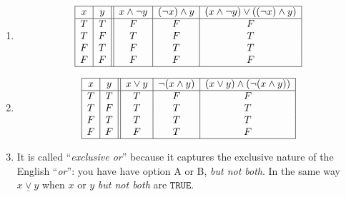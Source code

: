 \documentclass{article}
\theoremstyle{definition}
\newcommand{\xor}{\underline{\lor}}
\begin{document}
\begin{solution}
	\begin{enumerate}
	\item 
	\[\begin{array}{| c | c || c | c | c |}
	\hline
	x & y & x\wedge \neg y & (\neg x)\wedge y & (x \wedge \neg y) \vee ((\neg x) \wedge y)\\
	\hline
		T & T & F & F & F\\
		T & F & T & F & T\\
		F & T & F & T & T\\
		F & F & F & F & F\\
	\hline
	\end{array}\]
	\item 
	\[\begin{array}{| c | c || c | c | c |}
	\hline
	x & y & x\vee y & \neg (x \wedge y) & (x \vee y) \wedge (\neg (x \wedge y))\\
	\hline
		T & T & T & F & F\\
		T & F & T & T & T\\
		F & T & T & T & T\\
		F & F & F & T & F\\
	\hline
	\end{array}\]
	\item It is called ``\textit{exclusive or}'' because it captures the exclusive nature of the English ``\textit{or}'': you have have option A or B, \textit{but not both}. In the same way $x\xor y$ when $x$ or $y$ \textit{but not both} are $\mathtt{TRUE}$.
	\end{enumerate}
\end{solution}
\end{document}
